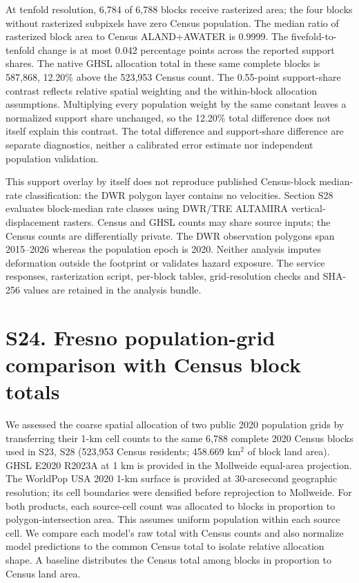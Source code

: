 \documentclass[10pt,a4paper]{article}
\begin{document}
At tenfold resolution, 6,784 of 6,788 blocks receive rasterized area; the four blocks without rasterized subpixels have zero Census population. The median ratio of rasterized block area to Census ALAND+AWATER is 0.9999. The fivefold-to-tenfold change is at most 0.042 percentage points across the reported support shares. The native GHSL allocation total in these same complete blocks is 587,868, 12.20\% above the 523,953 Census count. The 0.55-point support-share contrast reflects relative spatial weighting and the within-block allocation assumptions. Multiplying every population weight by the same constant leaves a normalized support share unchanged, so the 12.20\% total difference does not itself explain this contrast. The total difference and support-share difference are separate diagnostics, neither a calibrated error estimate nor independent population validation.

This support overlay by itself does not reproduce published Census-block median-rate classification: the DWR polygon layer contains no velocities. Section S28 evaluates block-median rate classes using DWR/TRE ALTAMIRA vertical-displacement rasters. Census and GHSL counts may share source inputs; the Census counts are differentially private. The DWR observation polygons span 2015--2026 whereas the population epoch is 2020. Neither analysis imputes deformation outside the footprint or validates hazard exposure. The service responses, rasterization script, per-block tables, grid-resolution checks and SHA-256 values are retained in the analysis bundle.



\section*{S24. Fresno population-grid comparison with Census block totals}

We assessed the coarse spatial allocation of two public 2020 population grids by transferring their 1-km cell counts to the same 6,788 complete 2020 Census blocks used in S23, S28 (523,953 Census residents; 458.669 km$^2$ of block land area). GHSL E2020 R2023A at 1 km is provided in the Mollweide equal-area projection. The WorldPop USA 2020 1-km surface is provided at 30-arcsecond geographic resolution; its cell boundaries were densified before reprojection to Mollweide. For both products, each source-cell count was allocated to blocks in proportion to polygon-intersection area. This assumes uniform population within each source cell. We compare each model's raw total with Census counts and also normalize model predictions to the common Census total to isolate relative allocation shape. A baseline distributes the Census total among blocks in proportion to Census land area.
\end{document}
